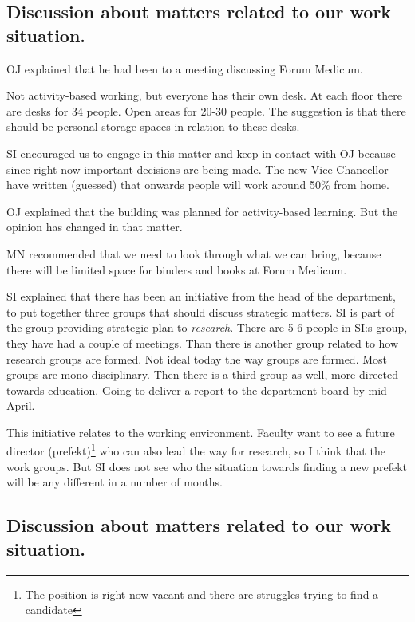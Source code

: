\documentclass[
]{article}
\begin{document}
\hypertarget{discussion-about-matters-related-to-our-work-situation.}{%
\subsection{Discussion about matters related to our work
situation.}\label{discussion-about-matters-related-to-our-work-situation.}}

OJ explained that he had been to a meeting discussing Forum Medicum.

Not activity-based working, but everyone has their own desk. At each
floor there are desks for 34 people. Open areas for 20-30 people. The
suggestion is that there should be personal storage spaces in relation
to these desks.

SI encouraged us to engage in this matter and keep in contact with OJ
because since right now important decisions are being made. The new Vice
Chancellor have written (guessed) that onwards people will work around
50\% from home.

OJ explained that the building was planned for activity-based learning.
But the opinion has changed in that matter.

MN recommended that we need to look through what we can bring, because
there will be limited space for binders and books at Forum Medicum.

SI explained that there has been an initiative from the head of the
department, to put together three groups that should discuss strategic
matters. SI is part of the group providing strategic plan to
\emph{research}. There are 5-6 people in SI:s group, they have had a
couple of meetings. Than there is another group related to how research
groups are formed. Not ideal today the way groups are formed. Most
groups are mono-disciplinary. Then there is a third group as well, more
directed towards education. Going to deliver a report to the department
board by mid-April.

This initiative relates to the working environment. Faculty want to see
a future director (prefekt)\footnote{The position is right now vacant
  and there are struggles trying to find a candidate} who can also lead
the way for research, so I think that the work groups. But SI does not
see who the situation towards finding a new prefekt will be any
different in a number of months.

\hypertarget{discussion-about-matters-related-to-our-work-situation.}{%
\subsection{Discussion about matters related to our work
situation.}\label{discussion-about-matters-related-to-our-work-situation.}}
\end{document}

